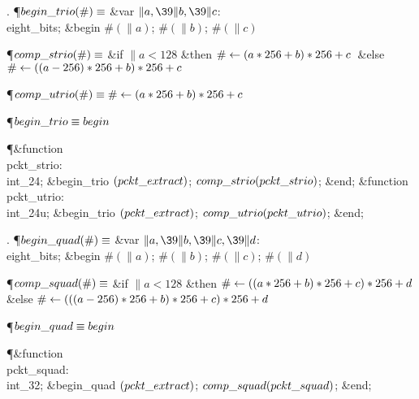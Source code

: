 . \P\D {}$\\{begin\_trio}(\#)\S$\1\6
\4\&{var} $\|a,\39\|b,\39\|c$: \\{eight\_bits};\2\6
\&{begin} $\#(\|a)$;\5
$\#(\|b)$;\5
$\#(\|c)$\par
\P\D {}$\\{comp\_strio}(\#)\S$\1\6
\&{if} $\|a<128$ \1\&{then}\5
$\#\K(\|a\ast256+\|b)\ast256+\|c$\ \&{else} $\#\K((\|a-256)\ast256+\|b)\ast256+%
\|c$\2\2\par
\P\D {}$\\{comp\_utrio}(\#)\S\#\K(\|a\ast256+\|b)\ast256+\|c$\par
\P\F {}$\\{begin\_trio}\S\\{begin}$\par
\Y\P\4\&{function}\1\  \\{pckt\_strio}: \\{int\_24};\2\6
\&{begin\_trio} $(\\{pckt\_extract})$;\5
$\\{comp\_strio}(\\{pckt\_strio})$;\6
\&{end};\7
\4\&{function}\1\  \\{pckt\_utrio}: \\{int\_24u};\2\6
\&{begin\_trio} $(\\{pckt\_extract})$;\5
$\\{comp\_utrio}(\\{pckt\_utrio})$;\6
\&{end};\par
\fi

. \P\D {}$\\{begin\_quad}(\#)\S$\1\6
\4\&{var} $\|a,\39\|b,\39\|c,\39\|d$: \\{eight\_bits};\2\6
\&{begin} $\#(\|a)$;\5
$\#(\|b)$;\5
$\#(\|c)$;\5
$\#(\|d)$\par
\P\D {}$\\{comp\_squad}(\#)\S$\1\6
\&{if} $\|a<128$ \1\&{then}\5
$\#\K((\|a\ast256+\|b)\ast256+\|c)\ast256+\|d$\6
\4\&{else} $\#\K(((\|a-256)\ast256+\|b)\ast256+\|c)\ast256+\|d$\2\2\par
\P\F {}$\\{begin\_quad}\S\\{begin}$\par
\Y\P\4\&{function}\1\  \\{pckt\_squad}: \\{int\_32};\2\6
\&{begin\_quad} $(\\{pckt\_extract})$;\5
$\\{comp\_squad}(\\{pckt\_squad})$;\6
\&{end};\par
\fi

